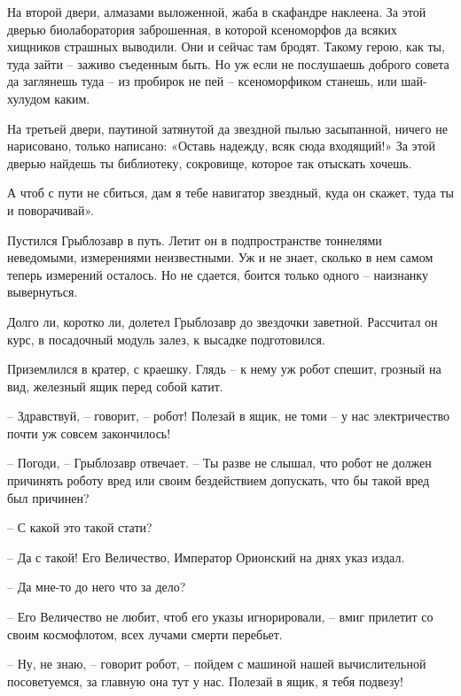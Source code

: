 \documentclass[ebook,oneside,final,openright]{memoir}
\begin{document}
\par
На второй двери, алмазами выложенной, жаба в скафандре наклеена. За этой дверью биолаборатория заброшенная, в которой ксеноморфов да всяких хищников страшных выводили. Они и сейчас там бродят. Такому герою, как ты, туда зайти – заживо съеденным быть. Но уж если не послушаешь доброго совета да заглянешь туда – из пробирок не пей – ксеноморфиком станешь, или шай-хулудом каким.\par
\par
На третьей двери, паутиной затянутой да звездной пылью засыпанной, ничего не нарисовано, только написано: «Оставь надежду, всяк сюда входящий!» За этой дверью найдешь ты библиотеку, сокровище, которое так отыскать хочешь.\par
\par
А чтоб с пути не сбиться, дам я тебе навигатор звездный, куда он скажет, туда ты и поворачивай».\par
\par
Пустился Грыблозавр в путь. Летит он в подпространстве тоннелями неведомыми, измерениями неизвестными. Уж и не знает, сколько в нем самом теперь измерений осталось. Но не сдается, боится только одного – наизнанку вывернуться.\par
\par
Долго ли, коротко ли, долетел Грыблозавр до звездочки заветной. Рассчитал он курс, в посадочный модуль залез, к высадке подготовился.\par
\par
Приземлился в кратер, с краешку. Глядь – к нему уж робот спешит, грозный на вид, железный ящик перед собой катит.\par
– Здравствуй, – говорит, – робот! Полезай в ящик, не томи – у нас электричество почти уж совсем закончилось!\par
– Погоди, – Грыблозавр отвечает. – Ты разве не слышал, что робот не должен причинять роботу вред или своим бездействием допускать, что бы такой вред был причинен?\par
– С какой это такой стати?\par
– Да с такой! Его Величество, Император Орионский на днях указ издал.\par
– Да мне-то до него что за дело?\par
– Его Величество не любит, чтоб его указы игнорировали, – вмиг прилетит со своим космофлотом, всех лучами смерти перебьет.\par
– Ну, не знаю, – говорит робот, – пойдем с машиной нашей вычислительной посоветуемся, за главную она тут у нас. Полезай в ящик, я тебя подвезу!\par
\end{document}
